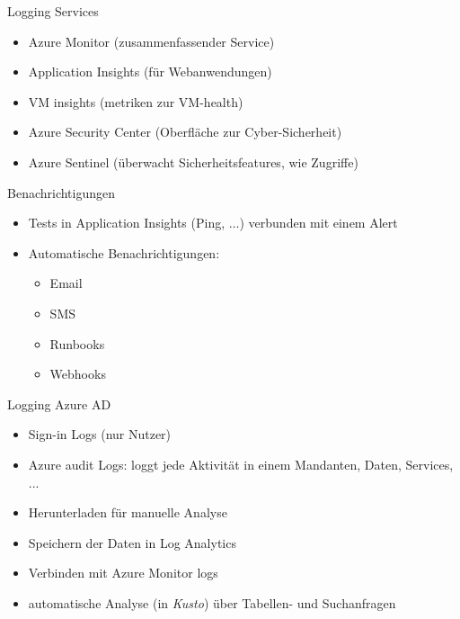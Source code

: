 
\begin{flashcard}[Definition]{Logging Services}
  \begin{itemize}
    \item Azure Monitor (zusammenfassender Service)
    \item Application Insights (für Webanwendungen)
    \item VM insights (metriken zur VM-health)
    \item Azure Security Center (Oberfläche zur Cyber-Sicherheit)
    \item Azure Sentinel (überwacht Sicherheitsfeatures, wie Zugriffe)
  \end{itemize}
\end{flashcard}


\begin{flashcard}[Definition]{Benachrichtigungen}
  \begin{itemize}
    \item Tests in Application Insights (Ping, $\ldots$) verbunden mit einem Alert
    \item Automatische Benachrichtigungen:
    \begin{itemize}
      \item Email
      \item SMS
      \item Runbooks
      \item Webhooks
    \end{itemize}

  \end{itemize}
\end{flashcard}


\begin{flashcard}[Definition]{Logging Azure AD}
  \begin{itemize}
    \item Sign-in Logs (nur Nutzer)
    \item Azure audit Logs: \newline
      loggt jede Aktivität in einem Mandanten, Daten, Services, ...
    \item Herunterladen für manuelle Analyse
    \item Speichern der Daten in Log Analytics
    \item Verbinden mit Azure Monitor logs
    \item automatische Analyse (in \emph{Kusto}) über Tabellen- und Suchanfragen
  \end{itemize}
\end{flashcard}
